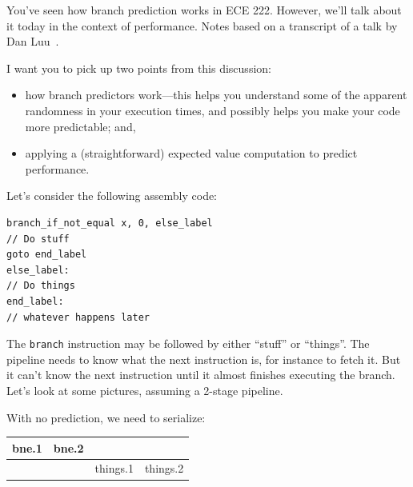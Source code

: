 \documentclass[a4paper]{report}
\begin{document}
You've seen how branch prediction works in ECE 222. However, we'll talk about it today in the context of performance. Notes based on a transcript of a talk by Dan Luu~\cite{branchprediction}.

I want you to pick up two points from this discussion:
\vspace*{-1em}
\begin{itemize}[noitemsep]
\item how branch predictors work---this helps you understand some of the apparent randomness in your
execution times, and possibly helps you make your code more predictable; and,
\item applying a (straightforward) expected value computation to predict performance.
\end{itemize}

Let's consider the following assembly code:

\hspace*{2em} \begin{minipage}{.4\textwidth} \begin{lstlisting}
branch_if_not_equal x, 0, else_label
// Do stuff
goto end_label
else_label:
// Do things
end_label:
// whatever happens later
\end{lstlisting}
\end{minipage}

The {\tt branch} instruction may be followed by either ``stuff'' or ``things''.
The pipeline needs to know what the next instruction is, for instance to fetch it.
But it can't know the next instruction until it almost finishes executing the branch.
Let's look at some pictures, assuming a 2-stage pipeline.

With no prediction, we need to serialize:

\begin{center}
\begin{tabular}{c|c|c|c}
bne.1 & bne.2 \\ \hline
& & things.1 & things.2
\end{tabular}
\end{center}
\end{document}
